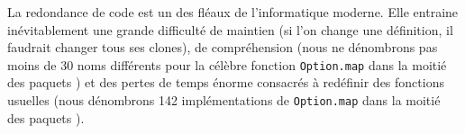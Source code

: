 
La redondance de code est un des fléaux de l'informatique moderne. Elle entraine inévitablement une grande difficulté de maintien (si l'on change une définition, il faudrait changer tous ses clones), de compréhension (nous ne dénombrons pas moins de 30 noms différents pour la célèbre fonction \verb|Option.map| dans la moitié des paquets \Opam) et des pertes de temps énorme consacrés à redéfinir des fonctions usuelles (nous dénombrons 142 implémentations de \verb|Option.map| dans la moitié des paquets \Opam).